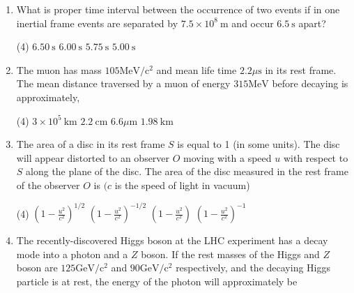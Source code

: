 \begin{enumerate}
\begin{tasks}(4)
	\task[\textbf{A.}] $60 \mathrm{~s}$
	\task[\textbf{B.}]$40 \mathrm{~s}$
	\task[\textbf{C.}]$20 s$
	\task[\textbf{D.}] $0 s$
\end{tasks}
	\item What is proper time interval between the occurrence of two events if in one inertial frame events are separated by $7.5 \times 10^{8} \mathrm{~m}$ and occur $6.5 \mathrm{~s}$ apart?
	{}
\begin{tasks}(4)
	\task[\textbf{A.}] $6.50 \mathrm{~s}$
	\task[\textbf{B.}]$6.00 \mathrm{~s}$
	\task[\textbf{C.}]$5.75 \mathrm{~s}$
	\task[\textbf{D.}]$5.00 \mathrm{~s}$
\end{tasks}
	\item The muon has mass $105 \mathrm{MeV} / \mathrm{c}^{2}$ and mean life time $2.2 \mu \mathrm{s}$ in its rest frame. The mean distance traversed by a muon of energy $315 \mathrm{MeV}$ before decaying is approximately,
{	}

\begin{tasks}(4)
	\task[\textbf{A.}] $3 \times 10^{5} \mathrm{~km}$ 
	\task[\textbf{B.}]$2.2 \mathrm{~cm}$
	\task[\textbf{C.}]$6.6 \mu \mathrm{m}$
	\task[\textbf{D.}]$1.98 \mathrm{~km}$
\end{tasks}

	\item The area of a disc in its rest frame $S$ is equal to 1 (in some units). The disc will appear distorted to an observer $O$ moving with a speed $u$ with respect to $S$ along the plane of the disc. The area of the disc measured in the rest frame of the observer $O$ is $(c$ is the speed of light in vacuum)
	{}

\begin{tasks}(4)
	\task[\textbf{A.}] $\left(1-\frac{u^{2}}{c^{2}}\right)^{1 / 2}$
	\task[\textbf{B.}]$\left(1-\frac{u^{2}}{c^{2}}\right)^{-1 / 2}$
	\task[\textbf{C.}]$\left(1-\frac{u^{2}}{c^{2}}\right)$
	\task[\textbf{D.}]$\left(1-\frac{u^{2}}{c^{2}}\right)^{-1}$
\end{tasks}

	\item The recently-discovered Higgs boson at the LHC experiment has a decay mode into a photon and a $Z$ boson. If the rest masses of the Higgs and $Z$ boson are $125 \mathrm{GeV} / \mathrm{c}^{2}$ and $90 \mathrm{GeV} / \mathrm{c}^{2}$ respectively, and the decaying Higgs particle is at rest, the energy of the photon will approximately be
	{}


\end{enumerate}
